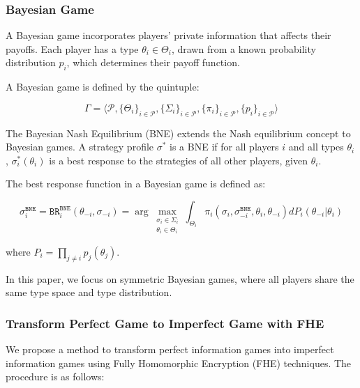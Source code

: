\documentclass[11pt]{article}
\begin{document}
\subsubsection{Bayesian Game}

A Bayesian game incorporates players' private information that affects their payoffs. Each player has a type $\theta_i \in \Theta_i$, drawn from a known probability distribution $p_i$, which determines their payoff function.

A Bayesian game is defined by the quintuple:

\begin{equation}
\Gamma = \langle \mathcal{P}, \{\Theta_i\}_{i\in\mathcal{P}}, \{\Sigma_i\}_{i\in\mathcal{P}}, \{\pi_i\}_{i\in\mathcal{P}}, \{p_i\}_{i\in\mathcal{P}} \rangle
\end{equation}

The Bayesian Nash Equilibrium (BNE) extends the Nash equilibrium concept to Bayesian games. A strategy profile $\sigma^*$ is a BNE if for all players $i$ and all types $\theta_i$, $\sigma_i^*(\theta_i)$ is a best response to the strategies of all other players, given $\theta_i$.

The best response function in a Bayesian game is defined as:

\begin{equation}
\sigma^\texttt{BNE}_i = \texttt{BR}^\texttt{BNE}_i(\theta_{-i},\sigma_{-i}) = \arg\max_{\substack{\sigma_i \in \Sigma_i \\ \theta_i\in \Theta_i}} \int_{\Theta_i} \pi_i(\sigma_i,\sigma^\texttt{BNE}_{-i},\theta_i,\theta_{-i})dP_i(\theta_{-i}|\theta_i)
\end{equation}

where $P_i = \prod_{j\neq i}p_j(\theta_j)$.

In this paper, we focus on symmetric Bayesian games, where all players share the same type space and type distribution.

\subsubsection{Transform Perfect Game to Imperfect Game with FHE}  
\label{sec:perfect2imperfect}
We propose a method to transform perfect information games into imperfect information games using Fully Homomorphic Encryption (FHE) techniques. The procedure is as follows:
\end{document}
